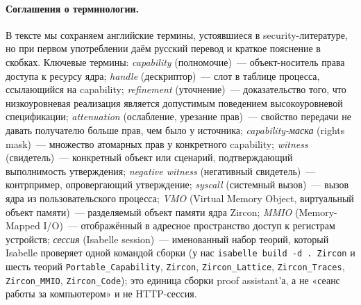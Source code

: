 \documentclass[11pt,a4paper]{article}
\begin{document}
\paragraph{Соглашения о терминологии.}
В тексте мы сохраняем английские термины, устоявшиеся в
security-литературе, но при первом употреблении даём русский перевод и
краткое пояснение в скобках. Ключевые термины:
\emph{capability} (полномочие)~--- объект-носитель права доступа к
ресурсу ядра;
\emph{handle} (дескриптор)~--- слот в таблице процесса, ссылающийся на
\textenglish{capability};
\emph{refinement} (уточнение)~--- доказательство того, что
низкоуровневая реализация является допустимым поведением
высокоуровневой спецификации;
\emph{attenuation} (ослабление, урезание прав)~--- свойство передачи не
давать получателю больше прав, чем было у источника;
\emph{capability-маска} (rights mask)~--- множество атомарных прав у
конкретного \textenglish{capability};
\emph{witness} (свидетель)~--- конкретный объект или сценарий,
подтверждающий выполнимость утверждения;
\emph{negative witness} (негативный свидетель)~--- контрпример,
опровергающий утверждение;
\emph{syscall} (системный вызов)~--- вызов ядра из пользовательского
процесса;
\emph{VMO} (Virtual Memory Object, виртуальный объект памяти)~---
разделяемый объект памяти ядра Zircon;
\emph{MMIO} (Memory-Mapped I/O)~--- отображённый в адресное пространство
доступ к регистрам устройств;
\emph{сессия} (Isabelle session)~--- именованный набор теорий, который
Isabelle проверяет одной командой сборки (у нас
\texttt{isabelle build -d . Zircon} и шесть теорий
\texttt{Portable\_Capability}, \texttt{Zircon}, \texttt{Zircon\_Lattice},
\texttt{Zircon\_Traces}, \texttt{Zircon\_MMIO}, \texttt{Zircon\_Code});
это единица сборки proof assistant'а, а не «сеанс работы за компьютером»
и не HTTP-сессия.
\end{document}
